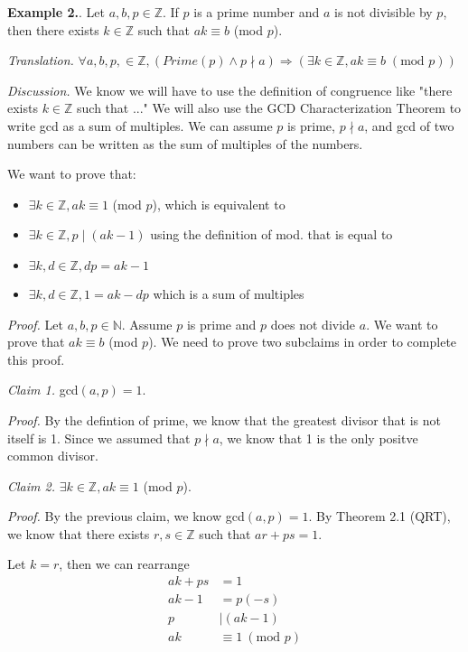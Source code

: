 \documentclass{article}
\newcounter{excount}
\newcommand\ex{\stepcounter{excount} \textbf{Example 2.\theexcount}. }
\begin{document}
\ex Let $a, b, p \in \mathbb{Z}$. If $p$ is a prime number and $a$ is not 
divisible by $p$, then there exists $k \in \mathbb{Z}$ such that $ak \equiv 
b$ (mod $p$).

\textit{Translation.} $\forall a, b, p, \in \mathbb{Z},(Prime(p) \land 
p \nmid a )\Rightarrow (\exists k \in \mathbb{Z}, ak \equiv b \;(\text{mod } p))$

\textit{Discussion.} We know we will have to use the definition of congruence 
like "there exists $k \in \mathbb{Z}$ such that ..." We will also use the 
GCD Characterization Theorem to write gcd as a sum of multiples. We can 
assume $p$ is prime, $p \nmid a$, and gcd of two numbers can be written 
as the sum of multiples of the numbers.

We want to prove that:
\begin{itemize}
    \item $\exists k \in \mathbb{Z}, ak \equiv 1$ (mod $p$), which is equivalent to 
    \item $\exists k \in \mathbb{Z}, p \mid (ak - 1)$ using the definition of 
        mod. that is equal to 
    \item $\exists k, d \in \mathbb{Z}, dp = ak - 1$ 
    \item $\exists k, d \in \mathbb{Z}, 1 = ak - dp$ which is a sum of multiples
\end{itemize}

\textit{Proof.} Let $a, b, p \in \mathbb{N}$. Assume $p$ is prime and $p$ 
does not divide $a$. We want to prove that $ak \equiv b$ (mod $p$). We need 
to prove two subclaims in order to complete this proof.

\textit{Claim 1.} gcd$(a, p) = 1$.

\textit{Proof.} By the defintion of prime, we know that the greatest divisor 
that is not itself is 1. Since we assumed that $p \nmid a$, we know that 
1 is the only positve common divisor. 

\textit{Claim 2.} $\exists k \in \mathbb{Z}, ak \equiv 1$ (mod $p$).

\textit{Proof.} By the previous claim, we know gcd$(a, p) =1$. By Theorem 2.1 
(QRT), we know that there exists $r, s \in \mathbb{Z}$ such that $ar + ps = 1.$

Let $k = r$, then we can rearrange 
\begin{align*}
    ak + ps &= 1 \\
    ak - 1 &= p(-s) \\
    p &\mid (ak -1) \\
    ak &\equiv 1 \:(\text{mod }p) 
\end{align*}
\end{document}
